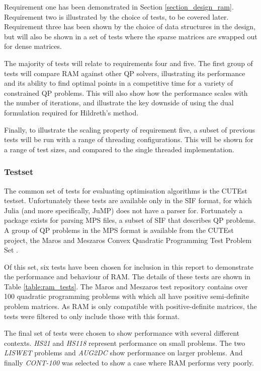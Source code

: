 Requirement one has been demonstrated in Section \ref{section_design_ram}. Requirement two is illustrated by the choice of tests, to be covered later. Requirement three has been shown by the choice of data structures in the design, but will also be shown in a set of tests where the sparse matrices are swapped out for dense matrices.

The majority of tests will relate to requirements four and five. The first group of tests will compare RAM against other QP solvers, illustrating its performance and its ability to find optimal points in a competitive time for a variety of constrained QP problems. This will also show how the performance scales with the number of iterations, and illustrate the key downside of using the dual formulation required for Hildreth's method.

Finally, to illustrate the scaling property of requirement five, a subset of previous tests will be run with a range of threading configurations. This will be shown for a range of test sizes, and compared to the single threaded implementation.

\subsubsection{Testset}

The common set of tests for evaluating optimisation algorithms is the CUTEst testset. Unfortunately these tests are available only in the SIF format, for which Julia (and more specifically, JuMP) does not have a parser for. Fortunately a package exists for parsing MPS files, a subset of SIF that describes QP problems. A group of QP problems in the MPS format is available from the CUTEst project, the Maros and Meszaros Convex Quadratic Programming Test Problem Set \cite{1997A}.

Of this set, six tests have been chosen for inclusion in this report to demonstrate the performance and behaviour of RAM. The details of these tests are shown in Table \ref{table:ram_tests}. The Maros and Meszaros test repository contains over 100 quadratic programming problems with which all have positive semi-definite problem matrices. As RAM is only compatible with positive-definite matrices, the tests were filtered to only include those with this format.

The final set of tests were chosen to show performance with several different contexts. \textit{HS21} and \textit{HS118} represent performance on small problems. The two \textit{LISWET} problems and \textit{AUG2DC} show performance on larger problems. And finally \textit{CONT-100} was selected to show a case where RAM performs very poorly.

